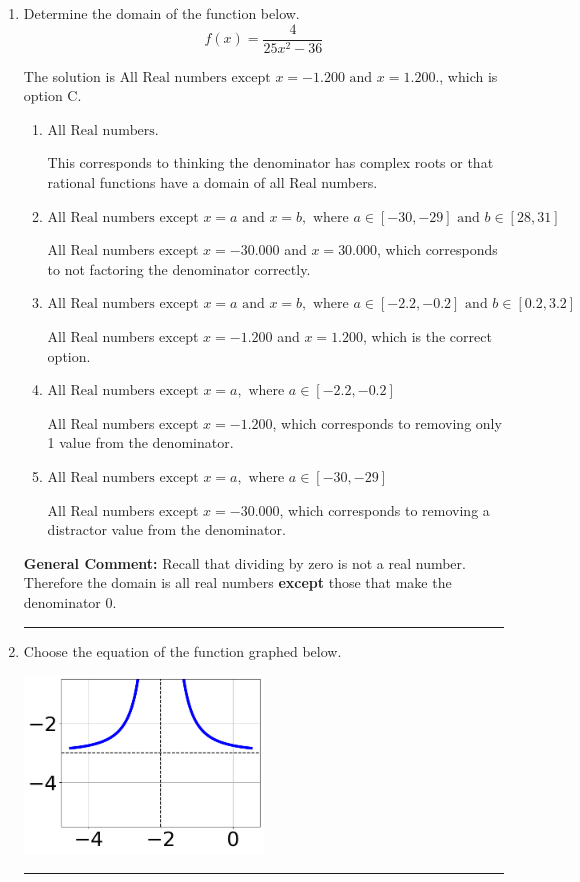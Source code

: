 \documentclass{extbook}[14pt]
\newcommand{\litem}[1]{\item #1

\rule{\textwidth}{0.4pt}}
\begin{document}
\begin{enumerate}\litem{
Determine the domain of the function below.
\[ f(x) = \frac{4}{25x^{2} -36} \]

The solution is \( \text{All Real numbers except } x = -1.200 \text{ and } x = 1.200. \), which is option C.\begin{enumerate}[label=\Alph*.]
\item \( \text{All Real numbers.} \)

This corresponds to thinking the denominator has complex roots or that rational functions have a domain of all Real numbers.
\item \( \text{All Real numbers except } x = a \text{ and } x = b, \text{ where } a \in [-30, -29] \text{ and } b \in [28, 31] \)

All Real numbers except $x = -30.000$ and $x = 30.000$, which corresponds to not factoring the denominator correctly.
\item \( \text{All Real numbers except } x = a \text{ and } x = b, \text{ where } a \in [-2.2, -0.2] \text{ and } b \in [0.2, 3.2] \)

All Real numbers except $x = -1.200$ and $x = 1.200$, which is the correct option.
\item \( \text{All Real numbers except } x = a, \text{ where } a \in [-2.2, -0.2] \)

All Real numbers except $x = -1.200$, which corresponds to removing only 1 value from the denominator.
\item \( \text{All Real numbers except } x = a, \text{ where } a \in [-30, -29] \)

All Real numbers except $x = -30.000$, which corresponds to removing a distractor value from the denominator.
\end{enumerate}

\textbf{General Comment:} Recall that dividing by zero is not a real number. Therefore the domain is all real numbers \textbf{except} those that make the denominator 0.
}
\litem{
Choose the equation of the function graphed below.

\begin{center}
    \includegraphics[width=0.5\textwidth]{../Figures/rationalGraphToEquationB.png}
\end{center}




}
\end{enumerate}
\end{document}
